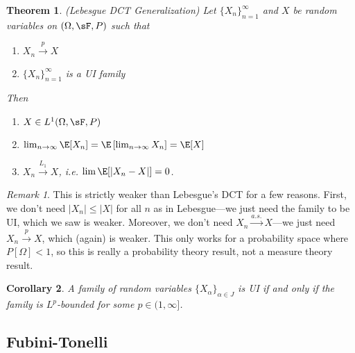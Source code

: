 \documentclass[12pt]{article}
\theoremstyle{plain}
\newtheorem{thm}{Theorem}[section]
\newtheorem{cor}[thm]{Corollary}
\theoremstyle{definition}
\theoremstyle{remark}
\newtheorem*{rmk}{Remark}
\newcommand{\asto}{\xrightarrow{a.s.}}
\newcommand{\pto}{\xrightarrow{p}}
\newcommand{\Lqto}[1]{\xrightarrow{L_{#1}}}
\newcommand{\ninf}{_{n=1}^\infty}
\newcommand{\limn}{\lim_{n\rightarrow\infty}}
\begin{document}
\begin{thm}\emph{(Lebesgue DCT Generalization)}
Let $\{X_n\}\ninf$ and $X$ be random variables on $(\Omega,\sF,P)$ such
that
\begin{enumerate}[label=(\roman*)]
  \item $X_n\pto X$
  \item $\{X_n\}\ninf$ is a UI family
\end{enumerate}
Then
\begin{enumerate}[label=(\roman*)]
  \item $X\in L^1(\Omega,\sF,P)$
  \item $\limn \E[X_n] = \E\left[\limn X_n\right] = \E[X]$
  \item $X_n \Lqto{1} X$, i.e. $\lim \E[|X_n-X|] = 0$.
\end{enumerate}
\end{thm}
\begin{rmk}
This is strictly weaker than Lebesgue's DCT for a few reasons. First, we
don't need $|X_n|\leq |X|$ for all $n$ as in Lebesgue---we just need the
family to be UI, which we saw is weaker. Moreover, we don't need
$X_n\asto X$---we just need $X_n\pto X$, which (again) is weaker.
This only works for a probability space where $P[\Omega]<1$, so this is
really a probability theory result, not a measure theory result.
\end{rmk}


\begin{cor}
A family of random variables $\{X_\alpha\}_{\alpha\in J}$ is UI if and
only if the family is $L^p$-bounded for some $p\in(1,\infty]$.
\end{cor}

\clearpage
\subsection{Fubini-Tonelli}
\end{document}
